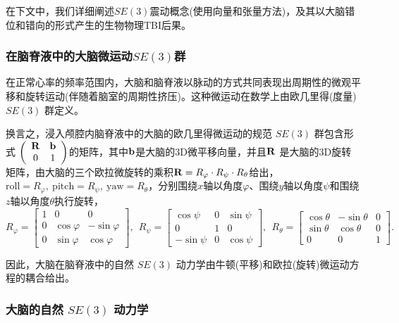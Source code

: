 \documentclass[11pt,fontset=founder]{ctexart}
\begin{document}
在下文中，我们详细阐述$SE(3)$震动概念(使用向量和张量方法)，及其以大脑错位和错向的形式产生的生物物理TBI后果。

\subsubsection{在脑脊液中的大脑微运动$SE(3)$群}

在正常心率的频率范围内，大脑和脑脊液以脉动的方式共同表现出周期性的微观平移和旋转运动(伴随着脑室的周期性挤压)。这种微运动在数学上由欧几里得(度量) $SE(3)$ 群定义。

换言之，浸入颅腔内脑脊液中的大脑的欧几里得微运动的规范 $SE(3)$ 群包含形式 {\small $ \left(
\begin{array}{cc}
{\bf R} & {\bf b} \\
0 & 1
\end{array}
\right)$}的矩阵，其中${\bf b}$是大脑的3D微平移向量，并且${\bf R}$ 是大脑的3D旋转矩阵，由大脑的三个欧拉微旋转的乘积${\bf R}=R_{\varphi }\cdot R_{\psi }\cdot R_{\theta }$给出，$\text{roll}=R_{\varphi },~\text{pitch}=R_{\psi },~\text{yaw}=R_{\theta }$，分别围绕$x$轴以角度$ \varphi $、围绕$y$轴以角度$\psi$和围绕$z$轴以角度$\theta $执行旋转，
{\small
\begin{equation*}
R_{\varphi } =\left[
\begin{array}{ccc}
1 & 0 & 0 \\
0 & \cos \varphi & -\sin \varphi \\
0 & \sin \varphi & \cos \varphi%
\end{array}
\right] , ~~ R_{\psi } =\left[
\begin{array}{ccc}
\cos \psi & 0 & \sin \psi \\
0 & 1 & 0 \\
-\sin \psi & 0 & \cos \psi%
\end{array}
\right] , ~~ R_{\theta } =\left[
\begin{array}{ccc}
\cos \theta & -\sin \theta & 0 \\
\sin \theta & \cos \theta & 0 \\
0 & 0 & 1%
\end{array}
\right].
\end{equation*}}

因此，大脑在脑脊液中的自然 $SE(3)$ 动力学由牛顿(平移)和欧拉(旋转)微运动方程的耦合给出。


\subsubsection{大脑的自然 $SE(3)$ 动力学}
\end{document}
